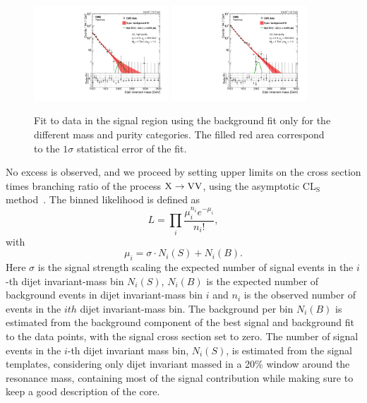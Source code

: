 \begin{figure}[h!]
\includegraphics[width=0.45\textwidth]{figures/analysis/search1/AN-15-211/fits/MLfits/BkgFit_DijetMassHighPuriZZ.pdf}
\includegraphics[width=0.45\textwidth]{figures/analysis/search1/AN-15-211/fits/MLfits/BkgFit_DijetMassLowPuriZZ.pdf}
\caption{Fit to data in the signal region using the background fit only for the different mass and purity categories. The filled red area correspond to the $1 \sigma$  statistical error of the fit.}
\label{fig:search1:bkgfitMassCat}
\end{figure}
No excess is observed, and we proceed by setting upper limits on the cross section times branching ratio of the process $\text{X} \to \mathrm{V}\mathrm{V}$, using the asymptotic $\textrm{CL}_\textrm{S}$ method~\cite{CLs}. The binned likelihood is defined as
\begin{equation}
L = \prod_i\frac{\mu^{n_i}_ie^{-\mu_i}}{n_i!},
\end{equation}
with
\begin{equation}
\mu_i=\sigma \cdot N_i(S)+N_i(B).
\end{equation}
Here $\sigma$ is the signal strength scaling the expected number of signal events in the $i$-th dijet invariant-mass bin $N_i(S)$, $N_i(B)$ is the expected number of background events in dijet invariant-mass bin $i$ and $n_i$ is the observed number of events in the $ith$ dijet invariant-mass bin. The background per bin $N_i(B)$ is estimated from the background component of the best signal and background fit to the data points, with the signal cross section set to zero. The number of signal events in the $i$-th dijet invariant mass bin, $N_i(S)$, is estimated from the signal templates, considering only dijet invariant massed in a 20\% window around the resonance mass, containing most of the signal contribution while making sure to keep a good description of the core.

